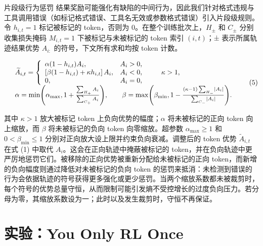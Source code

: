 \documentclass[
  10
]{article}
\begin{document}
片段级行为惩罚 结果奖励可能强化有缺陷的中间行为，因此我们针对格式违规与工具调用错误（如标记格式错误、工具名无效或参数格式错误）引入片段级规则。令 \(h _ { i , t } = 1\) 标记被标记的 token，否则为 0。在整个训练批次上，\(H _ { \pm }\) 和 \(C _ { \pm }\) 分别收集损失掩码 \(M _ { i , t } = 1\) 下被标记与未被标记的 token 索引 \(( i , t )\)；± 表示所属轨迹结果优势 \(A _ { i : }\) 的符号，下文所有求和均按 token 计数。

\[
\begin{array} { r l } & { \widetilde { A } _ { i , t } = \left\{ \begin{array} { l l } { \alpha ( 1 - h _ { i , t } ) A _ { i } , } & { A _ { i } > 0 , } \\ { \left[ \beta ( 1 - h _ { i , t } ) + \kappa h _ { i , t } \right] A _ { i } , } & { A _ { i } < 0 , } \\ { 0 , } & { A _ { i } = 0 , } \end{array} \right. \qquad \kappa > 1 , } \\ & { \alpha = \operatorname* { m i n } \Biggl ( \alpha _ { \operatorname* { m a x } } , 1 + \frac { \sum _ { H _ { + } } A _ { i } } { \sum _ { C _ { + } } A _ { i } } \Biggr ) , \qquad \beta = \operatorname* { m a x } \Biggl ( \beta _ { \operatorname* { m i n } } , 1 - \frac { \left( \kappa - 1 \right) \sum _ { H _ { - } } \left| A _ { i } \right| } { \sum _ { C _ { - } } \left| A _ { i } \right| } \Biggr ) . } \end{array}\tag{5}
\]

其中 \(\kappa > 1\) 放大被标记 token 上负向优势的幅度；\(\alpha\) 将未被标记的正向 token 向上缩放，而 \(\beta\) 将未被标记的负向 token 向零缩放。超参数 \(\alpha _ { \operatorname* { m a x } } \geq 1\) 和 \(0 < \beta _ { \mathrm { m i n } } \le 1\) 分别对正向放大设上限并约束负向衰减。调整后的 token 优势 \(\widetilde { A } _ { i , t }\) 在式 (1) 中取代 \(A _ { i }\)。这会在正向轨迹中掩蔽被标记的 token，并在负向轨迹中更严厉地惩罚它们。被移除的正向优势被重新分配给未被标记的正向 token，而新增的负向幅度则通过降低对未被标记的负向 token 的惩罚来抵消：未检测到错误的行为会依据轨迹的符号获得更多强化或更少惩罚。当两个缩放系数都未被裁剪时，每个符号的优势总量守恒，从而限制可能引发熵不受控增长的过度负向压力。若分母为零，其缩放系数设为一；此时以及发生裁剪时，守恒不再保证。

\section{实验：You Only RL Once}\label{experiments-you-only-rl-once}
\end{document}
